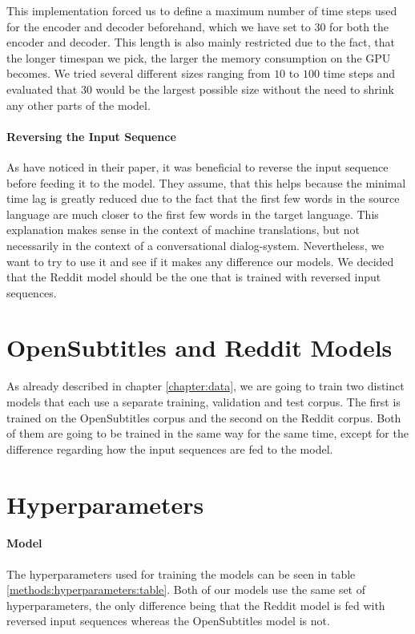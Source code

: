 This implementation forced us to define a maximum number of time steps used for the encoder and decoder beforehand, which we have set to $30$ for both the encoder and decoder. This length is also mainly restricted due to the fact, that the longer timespan we pick, the larger the memory consumption on the GPU becomes. We tried several different sizes ranging from $10$ to $100$ time steps and evaluated that $30$ would be the largest possible size without the need to shrink any other parts of the model.

\paragraph{Reversing the Input Sequence} As \cite{Sutskever:2014} have noticed in their paper, it was beneficial to reverse the input sequence before feeding it to the model. They assume, that this helps because the minimal time lag \cite{Hochreiter:1997} is greatly reduced due to the fact that the first few words in the source language are much closer to the first few words in the target language. This explanation makes sense in the context of machine translations, but not necessarily in the context of a conversational dialog-system. Nevertheless, we want to try to use it and see if it makes any difference our models. We decided that the Reddit model should be the one that is trained with reversed input sequences.

\section{OpenSubtitles and Reddit Models}
\label{methods:both_models}
As already described in chapter \ref{chapter:data}, we are going to train two distinct models that each use a separate training, validation and test corpus. The first is trained on the OpenSubtitles corpus and the second on the Reddit corpus. Both of them are going to be trained in the same way for the same time, except for the difference regarding how the input sequences are fed to the model.

\section{Hyperparameters}
\label{methods:hyperparameters}

\paragraph{Model} The hyperparameters used for training the models can be seen in table \ref{methods:hyperparameters:table}. Both of our models use the same set of hyperparameters, the only difference being that the Reddit model is fed with reversed input sequences whereas the OpenSubtitles model is not.

